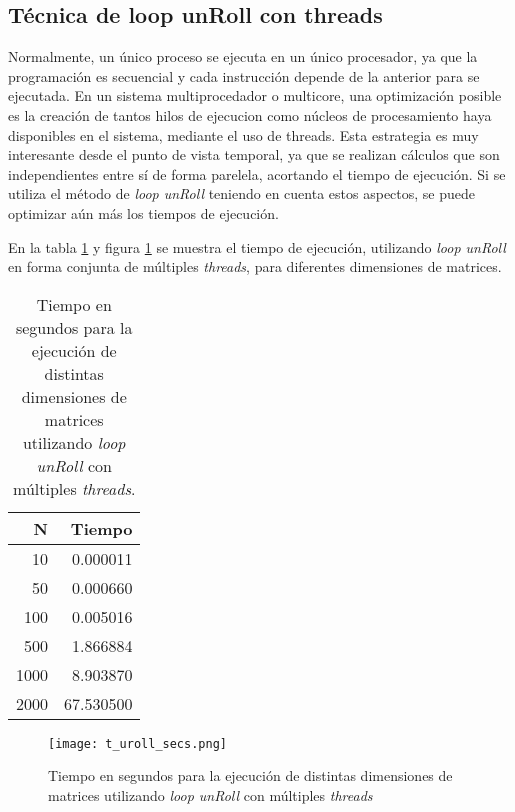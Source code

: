\documentclass[a4paper,11pt]{article}
\begin{document}
\subsection{T\'ecnica de loop unRoll con threads}
\label{loopunroll_threads}

Normalmente, un \'unico proceso se ejecuta en un \'unico procesador, ya que la programaci\'on es secuencial y cada instrucci\'on depende de la anterior para se ejecutada. En un sistema multiprocedador o multicore, una optimizaci\'on posible es la creaci\'on de tantos hilos de ejecucion como n\'ucleos de procesamiento haya disponibles en el sistema, mediante el uso de threads. Esta estrategia es muy interesante desde el punto de vista temporal, ya que se realizan c\'alculos que son independientes entre s\'i de forma parelela, acortando el tiempo de ejecuci\'on.
Si se utiliza el m\'etodo de \emph{loop unRoll} teniendo en cuenta estos aspectos, se puede optimizar a\'un m\'as los tiempos de ejecuci\'on.

En la tabla \ref{tabla3} y figura \ref{figura3} se muestra el tiempo de ejecuci\'on, utilizando \emph{loop unRoll} en forma conjunta de m\'ultiples \emph{threads}, para diferentes dimensiones de matrices.

\begin{table}
\begin{center}
\begin{tabular}{|r|r|}
\hline
         N & Tiempo \\
\hline
        10 &   0.000011 \\
\hline
        50 &   0.000660 \\
\hline
       100 &   0.005016 \\
\hline
       500 &   1.866884 \\
\hline
      1000 &   8.903870 \\
\hline
      2000 &   67.530500 \\
\hline
\end{tabular}
\caption{Tiempo en segundos para la ejecuci\'on de distintas dimensiones de matrices utilizando \emph{loop unRoll} con m\'ultiples \emph{threads}.}\label{tabla3}
\end{center}
\end{table}

\begin{figure}
\centering
\texttt{[image: t\_uroll\_secs.png]}
\caption{Tiempo en segundos para la ejecuci\'on de distintas dimensiones de matrices utilizando \emph{loop unRoll} con m\'ultiples \emph{threads}}\label{figura3}
\end{figure}
\end{document}
